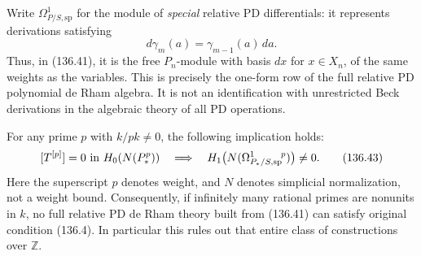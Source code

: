 \documentclass[11pt,a4paper]{article}
\theoremstyle{definition}\newtheorem{definition}[theorem]{Definition}
\theoremstyle{remark}\newtheorem{remark}[theorem]{Remark}
\begin{document}
Write $\Omega^1_{P/S,\mathrm{sp}}$ for the module of
\emph{special} relative PD differentials: it represents
derivations satisfying
\[
                   d\gamma_m(a)=\gamma_{m-1}(a)\,da.
                                                               \tag{136.42}
\]
Thus, in (136.41), it is the free $P_n$-module with
basis $dx$ for $x\in X_n$, of the same weights as
the variables.  This is precisely the one-form row
of the full relative PD polynomial de Rham algebra.
It is not an identification with unrestricted Beck
derivations in the algebraic theory of all PD operations.

For any prime $p$ with $k/pk\ne0$, the following
implication holds:
\[
 [T^{[p]}]=0\ \hbox{in }H_0(N(P_*^p))
 \quad\Longrightarrow\quad
 H_1\bigl(N(\Omega^1_{P_*/S,\mathrm{sp}}{}^{\!p})\bigr)
                                  \ne0.                    \tag{136.43}
\]
Here the superscript $p$ denotes weight, and $N$
denotes simplicial normalization, not a weight bound.
Consequently, if infinitely many rational primes
are nonunits in $k$, no full relative PD de Rham
theory built from (136.41) can satisfy original
condition (136.4).  In particular this rules out
that entire class of constructions over $\mathbb Z$.
\end{document}
